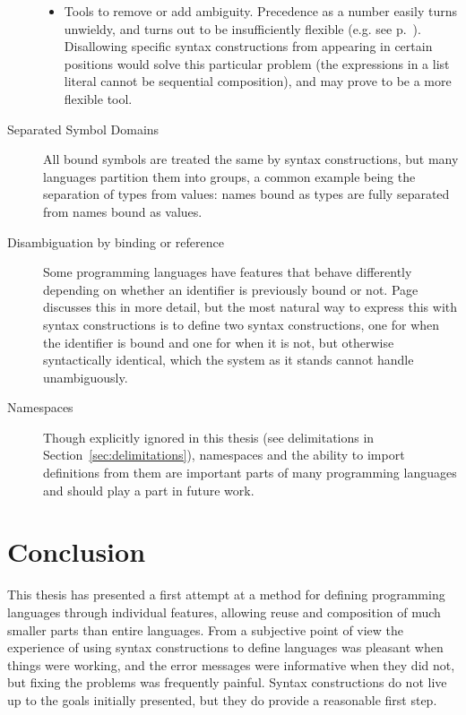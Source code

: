 \documentclass{kththesis}
\begin{document}
\begin{description}
\begin{itemize}
    \item Tools to remove or add ambiguity. Precedence as a number easily turns unwieldy, and turns out to be insufficiently flexible (e.g. see p.~\pageref{sec:ambiguous-lists}). Disallowing specific syntax constructions from appearing in certain positions would solve this particular problem (the expressions in a list literal cannot be sequential composition), and may prove to be a more flexible tool.
  \end{itemize}

  \item[Separated Symbol Domains] All bound symbols are treated the same by syntax constructions, but many languages partition them into groups, a common example being the separation of types from values: names bound as types are fully separated from names bound as values. %

  \item[Disambiguation by binding or reference] Some programming languages have features that behave differently depending on whether an identifier is previously bound or not. Page~\pageref{sec:prolog-pattern-matching} discusses this in more detail, but the most natural way to express this with syntax constructions is to define two syntax constructions, one for when the identifier is bound and one for when it is not, but otherwise syntactically identical, which the system as it stands cannot handle unambiguously.

  \item[Namespaces] Though explicitly ignored in this thesis (see delimitations in Section~\ref{sec:delimitations}), namespaces and the ability to import definitions from them are important parts of many programming languages and should play a part in future work.
\end{description}

\section{Conclusion}

This thesis has presented a first attempt at a method for defining programming languages through individual features, allowing reuse and composition of much smaller parts than entire languages. From a subjective point of view the experience of using syntax constructions to define languages was pleasant when things were working, and the error messages were informative when they did not, but fixing the problems was frequently painful. Syntax constructions do not live up to the goals initially presented, but they do provide a reasonable first step.
\end{document}
